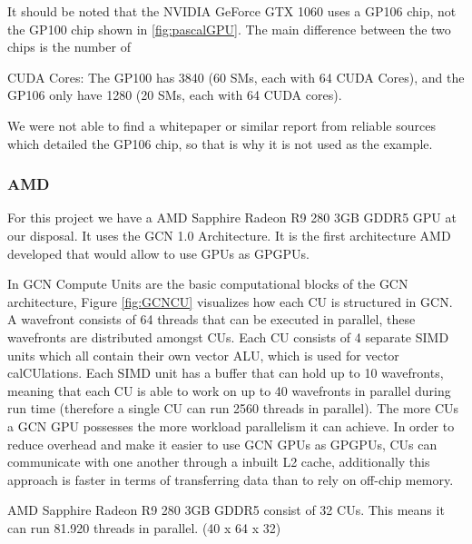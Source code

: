 It should be noted that the NVIDIA GeForce GTX 1060 uses a GP106 chip, not the GP100 chip shown in \ref{fig:pascalGPU}. 
The main difference between the two chips is the number of {CUDA Cores: The GP100 has 3840 (60 \glspl{SM}, each with 64 CUDA Cores), and the GP106 only have 1280 (20 \glspl{SM}, each with 64 CUDA cores).

We were not able to find a whitepaper or similar report from reliable sources which detailed the GP106 chip, so that is why it is not used as the example. 


\subsubsection{AMD}
For this project we have a AMD Sapphire Radeon R9 280 3GB GDDR5 \gls{GPU} at our disposal. It uses the \gls{GCN} 1.0 Architecture.
It is the first architecture AMD developed that would allow to use \glspl{GPU} as \glspl{GPGPU}.


In \gls{GCN} Compute Units are the basic computational blocks of the \gls{GCN} architecture, Figure \ref{fig:GCNCU} visualizes how each \gls{CU} is structured in \gls{GCN}.
A wavefront consists of 64 threads that can be executed in parallel, these wavefronts are distributed amongst \gls{CU}s. 
Each \gls{CU} consists of 4 separate SIMD units which all contain their own vector ALU, which is used for vector cal\gls{CU}lations.  
Each SIMD unit has a buffer that can hold up to 10 wavefronts, meaning that each \gls{CU} is able to work on up to 40 wavefronts in parallel during run time (therefore a single CU can run 2560 threads in parallel). 
The more \glspl{CU} a \gls{GCN} \gls{GPU} possesses the more workload parallelism it can achieve.
In order to reduce overhead and make it easier to use \gls{GCN} \glspl{GPU} as \glspl{GPGPU}, \glspl{CU} can communicate with one another through a inbuilt L2 cache, additionally this approach is faster in terms of transferring data than to rely on off-chip memory.

AMD Sapphire Radeon R9 280 3GB GDDR5 consist of 32 \glspl{CU}.
This means it can run 81.920 threads in parallel. (40 x 64 x 32)



}
